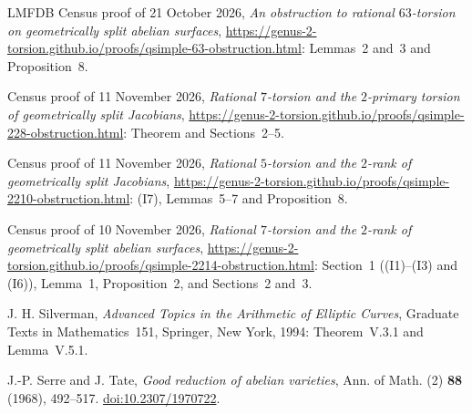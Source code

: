 \documentclass[11pt]{article}
\begin{document}
\begin{thebibliography}{LMFDB}
Census proof of 21 October 2026, \emph{An obstruction to rational \(63\)-torsion on geometrically split abelian
surfaces}, \url{https://genus-2-torsion.github.io/proofs/qsimple-63-obstruction.html}: Lemmas~2 and~3 and
Proposition~8.

Census proof of 11 November 2026, \emph{Rational \(7\)-torsion and the \(2\)-primary torsion of geometrically split
Jacobians}, \url{https://genus-2-torsion.github.io/proofs/qsimple-228-obstruction.html}: Theorem and Sections~2--5.

Census proof of 11 November 2026, \emph{Rational \(5\)-torsion and the \(2\)-rank of geometrically split
Jacobians}, \url{https://genus-2-torsion.github.io/proofs/qsimple-2210-obstruction.html}: (I7), Lemmas~5--7 and
Proposition~8.

Census proof of 10 November 2026, \emph{Rational \(7\)-torsion and the \(2\)-rank of geometrically split abelian
surfaces}, \url{https://genus-2-torsion.github.io/proofs/qsimple-2214-obstruction.html}: Section~1 ((I1)--(I3) and
(I6)), Lemma~1, Proposition~2, and Sections~2 and~3.

J. H. Silverman, \emph{Advanced Topics in the Arithmetic of Elliptic Curves}, Graduate Texts in Mathematics~151,
Springer, New York, 1994: Theorem~V.3.1 and Lemma~V.5.1.

J.-P. Serre and J. Tate, \emph{Good reduction of abelian varieties}, Ann. of Math. (2) \textbf{88} (1968),
492--517. \href{https://doi.org/10.2307/1970722}{doi:10.2307/1970722}.

\end{thebibliography}
\end{document}
